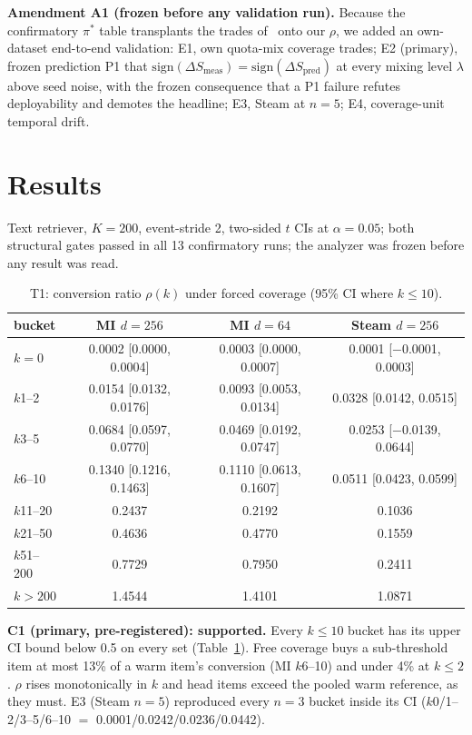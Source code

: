 \documentclass[sigconf,anonymous,review]{acmart}
\begin{document}
\textbf{Amendment A1 (frozen before any validation run).} Because the confirmatory $\pi^*$ table transplants the trades of~\cite{bottleneck} onto our $\rho$, we added an own-dataset end-to-end validation: E1, own quota-mix coverage trades; E2 (primary), frozen prediction P1 that $\mathrm{sign}(\Delta S_{\mathrm{meas}})=\mathrm{sign}(\Delta S_{\mathrm{pred}})$ at every mixing level $\lambda$ above seed noise, with the frozen consequence that a P1 failure refutes deployability and demotes the headline; E3, Steam at $n{=}5$; E4, coverage-unit temporal drift.

\section{Results}
\label{sec:results}
Text retriever, $K{=}200$, event-stride 2, two-sided $t$ CIs at $\alpha{=}0.05$; both structural gates passed in all 13 confirmatory runs; the analyzer was frozen before any result was read.

\begin{table}[t]
\caption{T1: conversion ratio $\rho(k)$ under forced coverage (95\% CI where $k\le 10$).}
\label{tab:t1}
\scriptsize
\setlength{\tabcolsep}{2.5pt}
\begin{tabular}{lccc}
\toprule
bucket & MI $d{=}256$ & MI $d{=}64$ & Steam $d{=}256$\\
\midrule
$k{=}0$ & 0.0002 [0.0000, 0.0004] & 0.0003 [0.0000, 0.0007] & 0.0001 [$-$0.0001, 0.0003]\\
$k$1--2 & 0.0154 [0.0132, 0.0176] & 0.0093 [0.0053, 0.0134] & 0.0328 [0.0142, 0.0515]\\
$k$3--5 & 0.0684 [0.0597, 0.0770] & 0.0469 [0.0192, 0.0747] & 0.0253 [$-$0.0139, 0.0644]\\
$k$6--10 & 0.1340 [0.1216, 0.1463] & 0.1110 [0.0613, 0.1607] & 0.0511 [0.0423, 0.0599]\\
$k$11--20 & 0.2437 & 0.2192 & 0.1036\\
$k$21--50 & 0.4636 & 0.4770 & 0.1559\\
$k$51--200 & 0.7729 & 0.7950 & 0.2411\\
$k{>}200$ & 1.4544 & 1.4101 & 1.0871\\
\bottomrule
\end{tabular}
\end{table}

\textbf{C1 (primary, pre-registered): supported.} Every $k\le 10$ bucket has its upper CI bound below 0.5 on every set (Table~\ref{tab:t1}). Free coverage buys a sub-threshold item at most 13\% of a warm item's conversion (MI $k$6--10) and under 4\% at $k\le 2$. $\rho$ rises monotonically in $k$ and head items exceed the pooled warm reference, as they must. E3 (Steam $n{=}5$) reproduced every $n{=}3$ bucket inside its CI ($k$0/1--2/3--5/6--10 $=$ 0.0001/0.0242/0.0236/0.0442).
\end{document}
